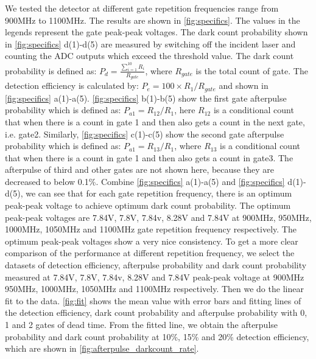 \documentclass[%
 reprint,
superscriptaddress,
 amsmath,amssymb,
 aps,
]{revtex4-1}
\begin{document}
We tested the detector at different gate repetition frequencies range from 900MHz to 1100MHz. The results are shown in \autoref{fig:specifics}. The values in the legends represent the gate peak-peak voltages. The dark count probability shown in \autoref{fig:specifics} d(1)-d(5) are measured by switching off the incident laser and counting the ADC outputs which exceed the threshold value. The dark count probability is defined as: $P_d = \frac{\sum_{i=1}^{10}R_{i} }{R_{gate}}$, where $R_{gate}$ is the total count of gate. The detection efficiency is calculated by: $P_e = 100\times R_{1}/R_{gate}$ and shown in \autoref{fig:specifics} a(1)-a(5). %
\autoref{fig:specifics} b(1)-b(5) show the first gate afterpulse probability which is defined as: $P_{a1} = R_{12}/R_1$, here $R_{12}$ is a conditional count that when there is a count in gate 1 and then also gets a count in the next gate, i.e. gate2.  Similarly, \autoref{fig:specifics} c(1)-c(5) show the second gate afterpulse probability which is defined as: $P_{a1} = R_{13}/R_1$, where $R_{13}$ is a conditional count that when there is a count in gate 1 and then also gets a count in gate3. The afterpulse of third and other gates are not shown here, because they are decreased to below 0.1\%. Combine \autoref{fig:specifics} a(1)-a(5) and  \autoref{fig:specifics} d(1)-d(5), we can see that for each gate repetition frequency, there is an optimum peak-peak voltage to achieve optimum dark count probability. The optimum peak-peak voltages are 7.84V, 7.8V, 7.84v, 8.28V and 7.84V at 900MHz, 950MHz, 1000MHz, 1050MHz and 1100MHz gate repetition frequency respectively. The optimum peak-peak voltages show a very nice consistency. To get a more clear comparison of the performance at different repetition frequency, we select the datasets of detection efficiency, afterpulse probability and dark count probability  measured at  7.84V, 7.8V, 7.84v, 8.28V and 7.84V peak-peak voltage at 900MHz 950MHz, 1000MHz, 1050MHz and 1100MHz respectively. Then we do the linear fit to the data. \autoref{fig:fit} shows the mean value with error bars and fitting lines of the detection efficiency, dark count probability and afterpulse probability with 0, 1 and 2 gates of dead time. From the fitted line, we obtain the afterpulse probability and dark count probability at 10\%, 15\% and 20\% detection efficiency, which are shown in \autoref{fig:afterpulse_darkcount_rate}.
\end{document}
